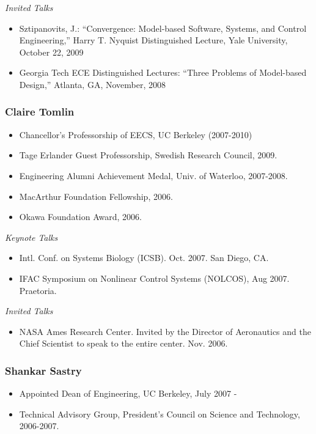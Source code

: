 \emph{Invited Talks}
\begin{itemize}
\item Sztipanovits, J.: ``Convergence: Model-based Software, Systems, and Control Engineering,'' Harry T. Nyquist Distinguished Lecture, Yale University, October 22, 2009
\item Georgia Tech ECE Distinguished Lectures: ``Three Problems of Model-based Design,'' Atlanta, GA, November, 2008
\end{itemize}

\subsubsection{Claire Tomlin}

\begin{itemize}
\item Chancellor's Professorship of EECS, UC Berkeley (2007-2010)
\item Tage Erlander Guest Professorship, Swedish Research Council, 2009.
\item Engineering Alumni Achievement Medal, Univ. of Waterloo, 2007-2008.
\item MacArthur Foundation Fellowship, 2006.
\item Okawa Foundation Award, 2006.
\end{itemize}

\emph{Keynote Talks}

\begin{itemize}
\item Intl. Conf. on Systems Biology (ICSB). Oct. 2007. San Diego, CA.
\item IFAC Symposium on Nonlinear Control Systems (NOLCOS), Aug 2007.  Praetoria.
\end{itemize}

\emph{Invited Talks}

\begin{itemize}
\item NASA Ames Research Center.  Invited by the Director of Aeronautics and the Chief Scientist to speak to the entire center. Nov. 2006.
\end{itemize}

\subsubsection{Shankar Sastry}

\begin{itemize}
\item Appointed Dean of Engineering, UC Berkeley, July 2007 -
\item Technical Advisory Group, President's Council on Science and Technology, 2006-2007.
\end{itemize}

